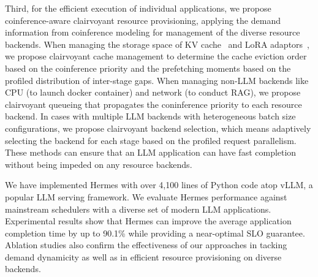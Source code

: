 Third, for the efficient execution of individual applications, we propose coinference-aware clairvoyant resource provisioning, applying the demand information from coinference modeling for management of the diverse resource backends.
When managing the storage space of KV cache~\cite{kwon2023efficient} and LoRA adaptors~\cite{hu2021lora}, we propose clairvoyant cache management to determine the cache eviction order based on the coinference priority and the prefetching moments based on the profiled distribution of inter-stage gaps. 
When managing non-LLM backends like CPU (to launch docker container) and network (to conduct RAG), we propose clairvoyant queueing that propagates the coninference priority to each resource backend.
In cases with multiple LLM backends with heterogeneous batch size configurations, we propose clairvoyant backend selection, which means adaptively selecting the backend for each stage based on the profiled request parallelism. 
These methods can ensure that an LLM application can have fast completion without being impeded on any resource backends.

We have implemented Hermes with over 4,100 lines of Python code atop vLLM, a popular LLM serving framework.
We evaluate Hermes performance against mainstream schedulers with a diverse set of modern LLM applications. 
Experimental results show that Hermes can improve the average application completion time by up to 90.1\% while providing a near-optimal SLO guarantee. 
Ablation studies also confirm the effectiveness of our approaches in tacking demand dynamicity as well as in efficient resource provisioning on diverse backends. %

